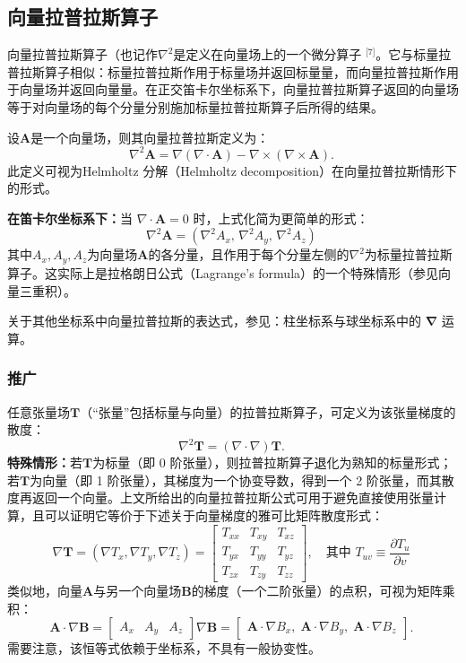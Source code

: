 \subsection{向量拉普拉斯算子}
向量拉普拉斯算子（也记作$\nabla^{2}$是定义在向量场上的一个微分算子 \(^\text{[7]}\)。它与标量拉普拉斯算子相似：标量拉普拉斯作用于标量场并返回标量量，而向量拉普拉斯作用于向量场并返回向量量。在正交笛卡尔坐标系下，向量拉普拉斯算子返回的向量场等于对向量场的每个分量分别施加标量拉普拉斯算子后所得的结果。

设$\mathbf{A}$是一个向量场，则其向量拉普拉斯定义为：
\[
\nabla^{2} \mathbf{A}
= \nabla (\nabla \cdot \mathbf{A})
- \nabla \times (\nabla \times \mathbf{A}).~
\]
此定义可视为Helmholtz 分解（Helmholtz decomposition）在向量拉普拉斯情形下的形式。

\textbf{在笛卡尔坐标系下：}当 $\nabla \cdot \mathbf{A} = 0$ 时，上式化简为更简单的形式：
\[
\nabla^{2} \mathbf{A}
= (\nabla^{2} A_{x},\, \nabla^{2} A_{y},\, \nabla^{2} A_{z})~
\]
其中$A_{x}, A_{y}, A_{z}$为向量场$\mathbf{A}$的各分量，且作用于每个分量左侧的$\nabla^{2}$为标量拉普拉斯算子。这实际上是拉格朗日公式（Lagrange’s formula）的一个特殊情形（参见向量三重积）。

关于其他坐标系中向量拉普拉斯的表达式，参见：柱坐标系与球坐标系中的 $\boldsymbol{\nabla}$ 运算。
\subsubsection{推广}
任意张量场$\mathbf{T}$（“张量”包括标量与向量）的拉普拉斯算子，可定义为该张量梯度的散度：
\[
\nabla^{2} \mathbf{T} = (\nabla \cdot \nabla) \mathbf{T}.~
\]
\textbf{特殊情形：}若$\mathbf{T}$为标量（即 0 阶张量），则拉普拉斯算子退化为熟知的标量形式；若$\mathbf{T}$为向量（即 1 阶张量），其梯度为一个协变导数，得到一个 2 阶张量，而其散度再返回一个向量。上文所给出的向量拉普拉斯公式可用于避免直接使用张量计算，且可以证明它等价于下述关于向量梯度的雅可比矩阵散度形式：
\[
\nabla \mathbf{T}
= (\nabla T_{x}, \nabla T_{y}, \nabla T_{z})
= 
\begin{bmatrix}
T_{xx} & T_{xy} & T_{xz} \\
T_{yx} & T_{yy} & T_{yz} \\
T_{zx} & T_{zy} & T_{zz}
\end{bmatrix},
\quad \text{其中 } T_{uv} \equiv \frac{\partial T_{u}}{\partial v}~
\]
类似地，向量$\mathbf{A}$与另一个向量场$\mathbf{B}$的梯度（一个二阶张量）的点积，可视为矩阵乘积：
\[
\mathbf{A} \cdot \nabla \mathbf{B}
= 
\begin{bmatrix}
A_{x} & A_{y} & A_{z}
\end{bmatrix}
\nabla \mathbf{B}
=
\begin{bmatrix}
\mathbf{A} \cdot \nabla B_{x},
\; \mathbf{A} \cdot \nabla B_{y},
\; \mathbf{A} \cdot \nabla B_{z}
\end{bmatrix}.~
\]
需要注意，该恒等式依赖于坐标系，不具有一般协变性。
